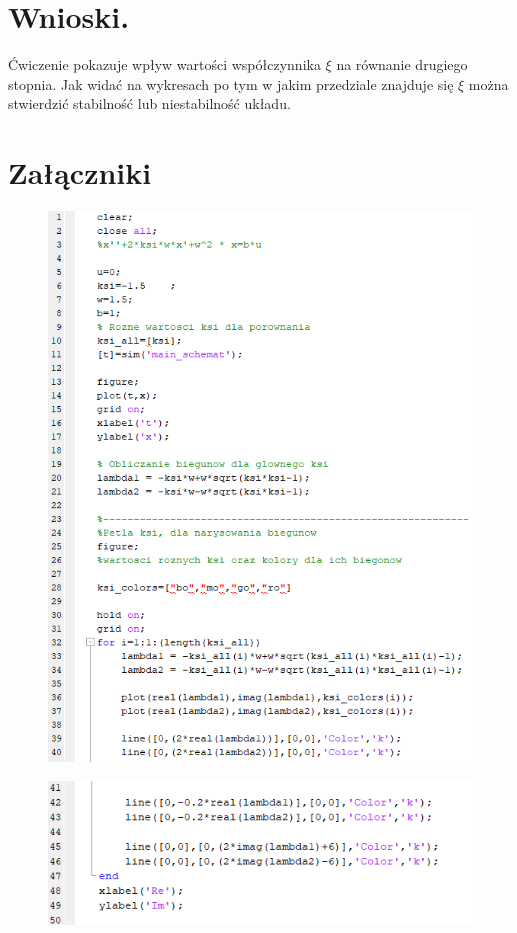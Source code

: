 \documentclass{article}
\begin{document}
\section{Wnioski.}


\par Ćwiczenie pokazuje wpływ wartości współczynnika $\xi$ na równanie drugiego stopnia. Jak widać na wykresach po tym w jakim przedziale znajduje się $\xi$ można stwierdzić stabilność lub niestabilność układu.
\newpage
\section{Załączniki}

 \begin{figure}[h!]
    \centering
    \includegraphics[scale=0.6]{kod1.png}

    \label{fig:ksi_1_5}
 \end{figure}
 
 \begin{figure}[h!]
    \centering
    \includegraphics[scale=0.6]{kod2.png}
    \label{fig:ksi_1_5}
 \end{figure}
\end{document}
